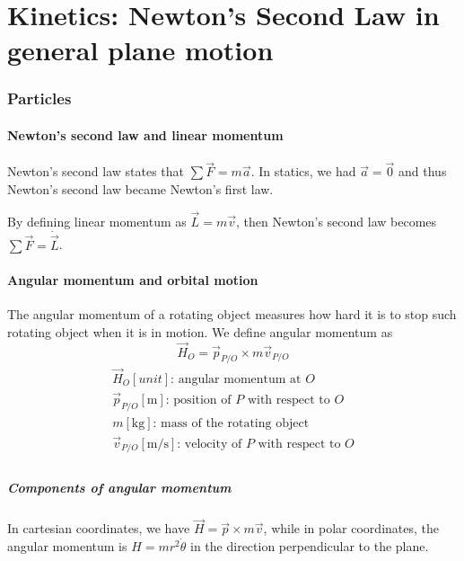 \documentclass[10pt, twocolumn]{article}
\begin{document}
\part{Kinetics: Newton's Second Law in general plane motion}
\section{Particles}
\subsection{Newton's second law and linear momentum}
Newton's second law states that \(\sum{\vec{F}} = m \vec{a}\).
In statics, we had \(\vec{a} = \vec{0}\) and thus Newton's second law became Newton's first law.

By defining linear momentum as \(\vec{L} = m \vec{v}\), then Newton's second law becomes  \(\sum{\vec{F}} = \dot{\vec{L}}\).


\subsection{Angular momentum and orbital motion}
The angular momentum of a rotating object measures how hard it is to stop such rotating object when it is in motion.
We define angular momentum as
\[
  \vec{H}_O = \vec{p}_{P/O} \times m\vec{v}_{P/O}
\]
\[
  \begin{array}{|l}
    \vec{H}_O [\si{unit}] \text{: angular momentum at } O                                     \\
    \vec{p}_{P/O} [\si{\metre}] \text{: position of } P \text{ with respect to } O            \\
    m [\si{\kilogram}] \text{: mass of the rotating object}                                   \\
    \vec{v}_{P/O} [\si{\metre\per\second}] \text{: velocity of } P \text{ with respect to } O \\
  \end{array}
\]



\subsubsection{Components of angular momentum}
In cartesian coordinates, we have \(\vec{H} = \vec{p} \times m \vec{v}\), while in polar coordinates, the angular momentum is \(H = m r^2 \dot{\theta}\) in the direction perpendicular to the plane.
\end{document}
